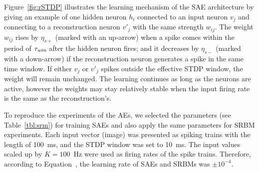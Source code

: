 Figure~\ref{fig:rSTDP} \DIFaddbegin {}\DIFaddend illustrates the learning mechanism of the SAE architecture by giving an example of one hidden neuron $h_i$ connected to an input neuron $v_j$ and connecting to a reconstruction neuron $v'_j$ with the same strength $w_{ij}$.
The weight $w_{ij}$ rises by $\eta_{s+}$ (marked with an up-arrow) when a spike comes within the period of $\tau_{\textit{\textrm{win}}}$ after the hidden neuron fires;
and it decreases by $\eta_{s-}$ (marked with a down-arrow) if the reconstruction neuron generates a spike in the same time window.
If either $v_j$ or $v'_j$ spikes outside the effective STDP window, the weight will remain unchanged.
The learning continues as long as the neurons are active, however the weights may stay relatively stable when the input firing rate is the same as the reconstruction's.

To reproduce the experiments of the AEs, we selected the parameters (see Table~\ref{tbl:srm}) for training SAEs and also apply the same parameters for SRBM experiments.
Each input vector (image) was presented as spiking trains with the length of 100~ms, and the STDP window was set to 10~ms.
The input values scaled up by $K=100$~Hz were used as firing rates of the spike trains.
Therefore, according to Equation~\DIFdelbegin \DIFdel{\ref{equ:eta_s}}\DIFdelend \DIFaddbegin \DIFadd{\ref{equ:srm}}\DIFaddend , the learning rate of SAEs and SRBMs was $\pm 10^{-4}$.

